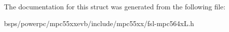 The documentation for this struct was generated from the following file\+:\begin{DoxyCompactItemize}
\item 
bsps/powerpc/mpc55xxevb/include/mpc55xx/fsl-\/mpc564x\+L.\+h\end{DoxyCompactItemize}
